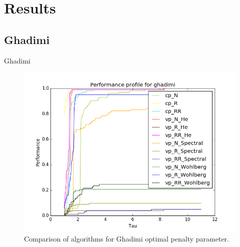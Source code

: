 \documentclass[8pt,red]{beamer}
\theoremstyle{plain}
\theoremstyle{definition}
\theoremstyle{remark}
\begin{document}
\section{Results}

\subsection{Ghadimi}
\begin{frame}{Ghadimi}
\begin{figure}[hbtp]
\centering
\includegraphics[scale=0.4]{Results/Ghadimi_mini.png}
\caption{Comparison of algorithms for Ghadimi optimal penalty parameter.}
\end{figure}
\end{frame}
\end{document}
